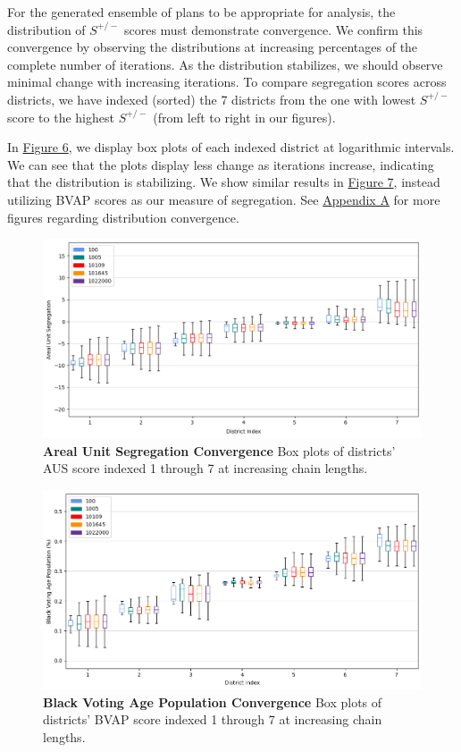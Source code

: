 \documentclass{article}
\begin{document}
For the generated ensemble of plans to be appropriate for analysis, the distribution of $S^{+/-}$ scores must demonstrate convergence. We confirm this convergence by observing the distributions at increasing percentages of the complete number of iterations. As the distribution stabilizes, we should observe minimal change with increasing iterations. To compare segregation scores across districts, we have indexed (sorted) the 7 districts from the one with lowest $S^{+/-}$ score to the highest $S^{+/-}$ (from left to right in our figures).
\par
In \hyperref[fig 6]{Figure 6}, we display box plots of each indexed district at logarithmic intervals. We can see that the plots display less change as iterations increase, indicating that the distribution is stabilizing. We show similar results in \hyperref[fig 7]{Figure 7}, instead utilizing BVAP scores as our measure of segregation. See \hyperref[convergence appendix]{Appendix A} for more figures regarding distribution convergence.
\
\begin{figure}[h]\label{fig 6}
    \centering
    \includegraphics[scale=.45]{images/asu_bxp_convergence.png}
    \caption{\textbf{Areal Unit Segregation Convergence} Box plots of districts' AUS score indexed 1 through 7 at increasing chain lengths.}
\end{figure}

\begin{figure}[h]\label{fig 7}
    \centering
    \includegraphics[scale=.45]{images/bvap_bxo_convergence.png}
    \caption{\textbf{Black Voting Age Population Convergence} Box plots of districts' BVAP score indexed 1 through 7 at increasing chain lengths.}
\end{figure}
\end{document}
